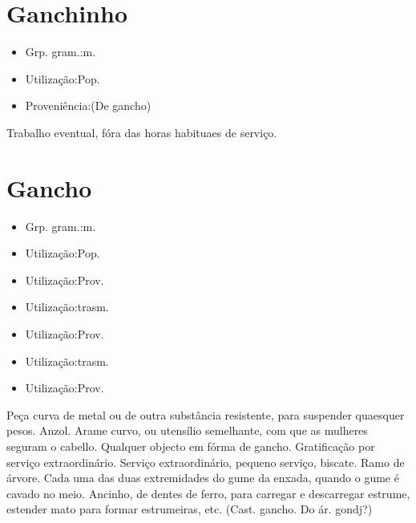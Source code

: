 \section{Ganchinho}
\begin{itemize}
\item {Grp. gram.:m.}
\end{itemize}
\begin{itemize}
\item {Utilização:Pop.}
\end{itemize}
\begin{itemize}
\item {Proveniência:(De \textunderscore gancho\textunderscore )}
\end{itemize}
Trabalho eventual, fóra das horas habituaes de serviço.
\section{Gancho}
\begin{itemize}
\item {Grp. gram.:m.}
\end{itemize}
\begin{itemize}
\item {Utilização:Pop.}
\end{itemize}
\begin{itemize}
\item {Utilização:Prov.}
\end{itemize}
\begin{itemize}
\item {Utilização:trasm.}
\end{itemize}
\begin{itemize}
\item {Utilização:Prov.}
\end{itemize}
\begin{itemize}
\item {Utilização:trasm.}
\end{itemize}
\begin{itemize}
\item {Utilização:Prov.}
\end{itemize}
Peça curva de metal ou de outra substância resistente, para suspender quaesquer pesos.
Anzol.
Arame curvo, ou utensílio semelhante, com que as mulheres seguram o cabello.
Qualquer objecto em fórma de gancho.
Gratificação por serviço extraordinário.
Serviço extraordinário, pequeno serviço, biscate.
Ramo de árvore.
Cada uma das duas extremidades do gume da enxada, quando o gume é cavado no meio.
Ancinho, de dentes de ferro, para carregar e descarregar estrume, estender mato para formar estrumeiras, etc.
(Cast. \textunderscore gancho\textunderscore . Do ár. \textunderscore gondj\textunderscore ?)
